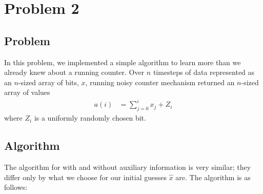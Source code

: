 %
%

%
\section{Problem 2}

\subsection{Problem}

In this problem, we implemented a simple algorithm to learn more than we already knew about a running counter.  
Over $n$ timesteps of data represented as an $n$-sized array of bits, $x$, running noisy counter mechanism
returned an $n$-sized array of values
\begin{align*}
    a(i) &= \sum_{j=0}^i x_j + Z_i
\end{align*}
where $Z_i$ is a uniformly randomly chosen bit.

\subsection{Algorithm}

The algorithm for with and without auxiliary information is very similar; they differ only by what we choose
for our initial guesses $\hat{x}$ are.  The algorithm is as follows:

